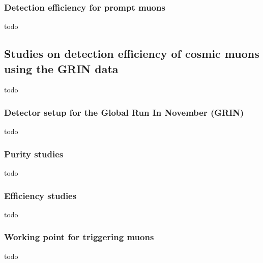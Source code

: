 		\subsubsection{Detection efficiency for prompt muons}
			todo
	\subsection{Studies on detection efficiency of cosmic muons using the GRIN data} 
		todo
		\subsubsection{Detector setup for the Global Run In November (GRIN)}
			todo
		\subsubsection{Purity studies}
			todo
		\subsubsection{Efficiency studies}
			todo
		\subsubsection{Working point for triggering muons}
			todo

